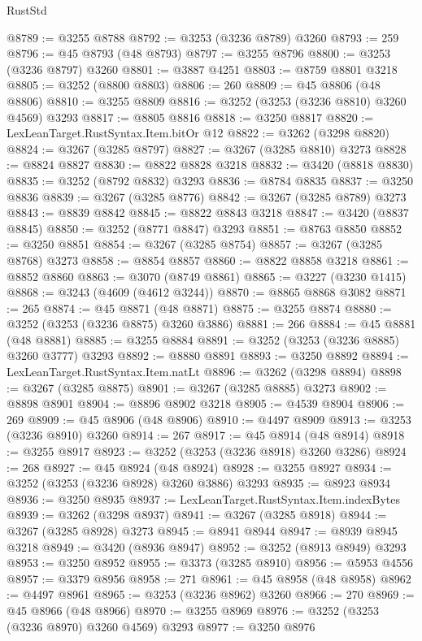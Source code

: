 \begin{lexlean}{RustStd}
\begin{coremodule}
@8789 := @3255 @8788
@8792 := @3253 (@3236 @8789) @3260
@8793 := 259
@8796 := @45 @8793 (@48 @8793)
@8797 := @3255 @8796
@8800 := @3253 (@3236 @8797) @3260
@8801 := @3887 @4251
@8803 := @8759 @8801 @3218
@8805 := @3252 (@8800 @8803)
@8806 := 260
@8809 := @45 @8806 (@48 @8806)
@8810 := @3255 @8809
@8816 := @3252 (@3253 (@3236 @8810) @3260 @4569) @3293
@8817 := @8805 @8816
@8818 := @3250 @8817
@8820 := LexLeanTarget.RustSyntax.Item.bitOr @12
@8822 := @3262 (@3298 @8820)
@8824 := @3267 (@3285 @8797)
@8827 := @3267 (@3285 @8810) @3273
@8828 := @8824 @8827
@8830 := @8822 @8828 @3218
@8832 := @3420 (@8818 @8830)
@8835 := @3252 (@8792 @8832) @3293
@8836 := @8784 @8835
@8837 := @3250 @8836
@8839 := @3267 (@3285 @8776)
@8842 := @3267 (@3285 @8789) @3273
@8843 := @8839 @8842
@8845 := @8822 @8843 @3218
@8847 := @3420 (@8837 @8845)
@8850 := @3252 (@8771 @8847) @3293
@8851 := @8763 @8850
@8852 := @3250 @8851
@8854 := @3267 (@3285 @8754)
@8857 := @3267 (@3285 @8768) @3273
@8858 := @8854 @8857
@8860 := @8822 @8858 @3218
@8861 := @8852 @8860
@8863 := @3070 (@8749 @8861)
@8865 := @3227 (@3230 @1415)
@8868 := @3243 (@4609 (@4612 @3244))
@8870 := @8865 @8868 @3082
@8871 := 265
@8874 := @45 @8871 (@48 @8871)
@8875 := @3255 @8874
@8880 := @3252 (@3253 (@3236 @8875) @3260 @3886)
@8881 := 266
@8884 := @45 @8881 (@48 @8881)
@8885 := @3255 @8884
@8891 := @3252 (@3253 (@3236 @8885) @3260 @3777) @3293
@8892 := @8880 @8891
@8893 := @3250 @8892
@8894 := LexLeanTarget.RustSyntax.Item.natLt
@8896 := @3262 (@3298 @8894)
@8898 := @3267 (@3285 @8875)
@8901 := @3267 (@3285 @8885) @3273
@8902 := @8898 @8901
@8904 := @8896 @8902 @3218
@8905 := @4539 @8904
@8906 := 269
@8909 := @45 @8906 (@48 @8906)
@8910 := @4497 @8909
@8913 := @3253 (@3236 @8910) @3260
@8914 := 267
@8917 := @45 @8914 (@48 @8914)
@8918 := @3255 @8917
@8923 := @3252 (@3253 (@3236 @8918) @3260 @3286)
@8924 := 268
@8927 := @45 @8924 (@48 @8924)
@8928 := @3255 @8927
@8934 := @3252 (@3253 (@3236 @8928) @3260 @3886) @3293
@8935 := @8923 @8934
@8936 := @3250 @8935
@8937 := LexLeanTarget.RustSyntax.Item.indexBytes
@8939 := @3262 (@3298 @8937)
@8941 := @3267 (@3285 @8918)
@8944 := @3267 (@3285 @8928) @3273
@8945 := @8941 @8944
@8947 := @8939 @8945 @3218
@8949 := @3420 (@8936 @8947)
@8952 := @3252 (@8913 @8949) @3293
@8953 := @3250 @8952
@8955 := @3373 (@3285 @8910)
@8956 := @5953 @4556
@8957 := @3379 @8956
@8958 := 271
@8961 := @45 @8958 (@48 @8958)
@8962 := @4497 @8961
@8965 := @3253 (@3236 @8962) @3260
@8966 := 270
@8969 := @45 @8966 (@48 @8966)
@8970 := @3255 @8969
@8976 := @3252 (@3253 (@3236 @8970) @3260 @4569) @3293
@8977 := @3250 @8976

\end{coremodule}
\end{lexlean}
